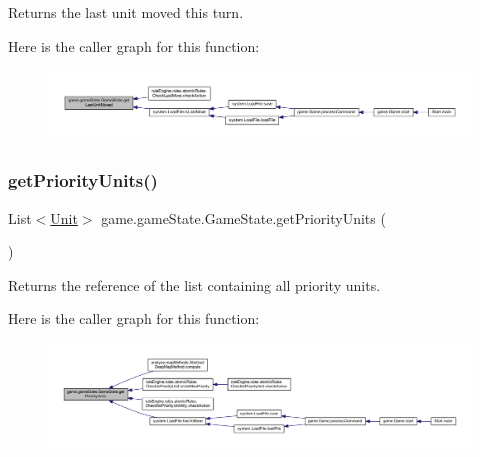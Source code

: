 \begin{DoxyReturn}{Returns}
the last unit moved this turn. 
\end{DoxyReturn}
Here is the caller graph for this function\+:
\nopagebreak
\begin{figure}[H]
\begin{center}
\leavevmode
\includegraphics[width=350pt]{classgame_1_1game_state_1_1_game_state_ac74c805b98b13a313b0a337e5fbd41d2_icgraph}
\end{center}
\end{figure}
\mbox{\label{classgame_1_1game_state_1_1_game_state_a825ff360e839e7d4976539b460846b25}} 
\subsubsection{\texorpdfstring{get\+Priority\+Units()}{getPriorityUnits()}}
{\footnotesize\ttfamily List$<$\mbox{\hyperlink{classgame_1_1board_1_1_unit}{Unit}}$>$ game.\+game\+State.\+Game\+State.\+get\+Priority\+Units (\begin{DoxyParamCaption}{ }\end{DoxyParamCaption})\hspace{0.3cm}{\ttfamily [inline]}}

\begin{DoxyReturn}{Returns}
the reference of the list containing all priority units. 
\end{DoxyReturn}
Here is the caller graph for this function\+:
\nopagebreak
\begin{figure}[H]
\begin{center}
\leavevmode
\includegraphics[width=350pt]{classgame_1_1game_state_1_1_game_state_a825ff360e839e7d4976539b460846b25_icgraph}
\end{center}
\end{figure}
\mbox{\label{classgame_1_1game_state_1_1_game_state_a270d806134a05500cc970ced6bee81bc}} 
